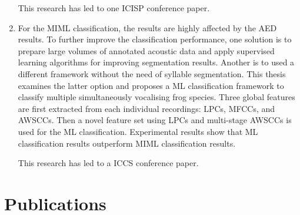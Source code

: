 \begin{enumerate}
This research has led to one ICISP conference paper.

\item For the MIML classification, the results are highly affected by the AED results. To further improve the classification performance, one solution is to prepare large volumes of annotated acoustic data and apply supervised learning algorithms for improving segmentation results. Another is to used a different framework without the need of syllable segmentation. This thesis examines the latter option and proposes a ML classification framework to classify multiple simultaneously vocalising frog species. Three global features are first extracted from each individual recordings: LPCs, MFCCs, and AWSCCs. Then a novel feature set using LPCs and multi-stage AWSCCs is used for the ML classification.
Experimental results show that ML classification results outperform MIML classification results. 

This research has led to a ICCS conference paper.


\end{enumerate}
 




\section{Publications}

